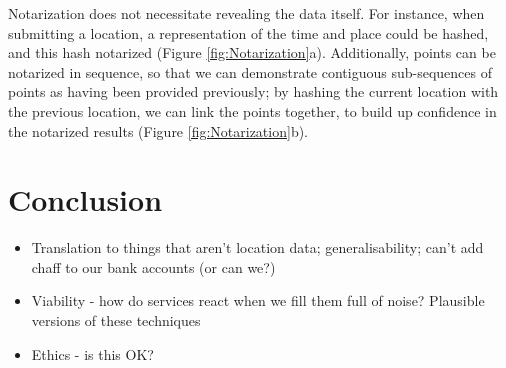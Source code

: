 \documentclass{IOS-Book-Article}     %
\begin{document}
Notarization does not necessitate revealing the data itself. For instance,
when submitting a location, a representation of the time and place could be
hashed, and this hash notarized (Figure \ref{fig:Notarization}a). Additionally,
points can be notarized in sequence, so that we can demonstrate contiguous sub-sequences 
of points as having been provided previously; by
hashing the current location with the previous location, we can link the points
together, to build up confidence in the notarized results (Figure
\ref{fig:Notarization}b).

\section{Conclusion}

\begin{itemize}
  \item Translation to things that aren't location data; generalisability; can't
  add chaff to our bank accounts (or can we?)
  \item Viability - how do services react when we fill them full of noise?
  Plausible versions of these techniques
  \item Ethics - is this OK?
\end{itemize}




\end{document}
